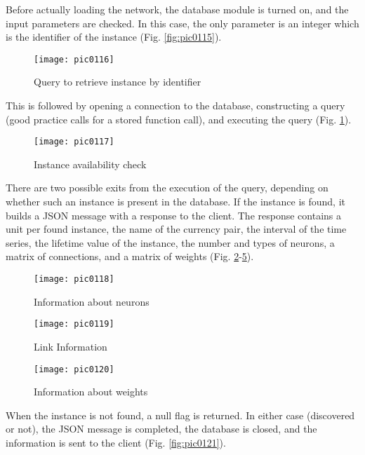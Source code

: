 Before actually loading the network, the database module is turned on, and the input parameters are checked. In this case, the only parameter is an integer which is the identifier of the instance (Fig. \ref{fig:pic0115}).

\begin{figure}[h]
\centering
\texttt{[image: pic0116]}
\caption{Query to retrieve instance by identifier}
\label{fig:pic0116}
\end{figure}
\FloatBarrier

This is followed by opening a connection to the database, constructing a query (good practice calls for a stored function call), and executing the query (Fig. \ref{fig:pic0116}).

\begin{figure}[h]
\centering
\texttt{[image: pic0117]}
\caption{Instance availability check}
\label{fig:pic0117}
\end{figure}
\FloatBarrier

There are two possible exits from the execution of the query, depending on whether such an instance is present in the database. If the instance is found, it builds a JSON message with a response to the client. The response contains a unit per found instance, the name of the currency pair, the interval of the time series, the lifetime value of the instance, the number and types of neurons, a matrix of connections, and a matrix of weights (Fig. \ref{fig:pic0117}-\ref{fig:pic0120}).

\begin{figure}[h]
\centering
\texttt{[image: pic0118]}
\caption{Information about neurons}
\label{fig:pic0118}
\end{figure}
\FloatBarrier

\begin{figure}[h]
\centering
\texttt{[image: pic0119]}
\caption{Link Information}
\label{fig:pic0119}
\end{figure}
\FloatBarrier

\begin{figure}[h]
\centering
\texttt{[image: pic0120]}
\caption{Information about weights}
\label{fig:pic0120}
\end{figure}
\FloatBarrier

When the instance is not found, a null flag is returned. In either case (discovered or not), the JSON message is completed, the database is closed, and the information is sent to the client (Fig. \ref{fig:pic0121}).

